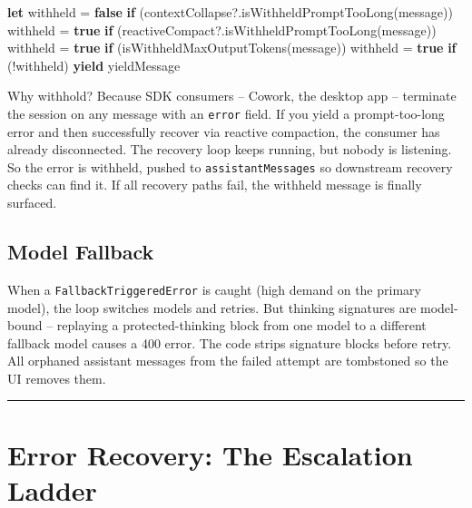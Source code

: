 \documentclass[
  english,
  11pt,
  letterpaper,
]{book}
\newenvironment{Shaded}{\begin{snugshade}}{\end{snugshade}}
\newcommand{\ControlFlowTok}[1]{\textcolor[rgb]{0.00,0.23,0.31}{\textbf{#1}}}
\newcommand{\FunctionTok}[1]{\textcolor[rgb]{0.28,0.35,0.67}{#1}}
\newcommand{\KeywordTok}[1]{\textcolor[rgb]{0.00,0.23,0.31}{\textbf{#1}}}
\newcommand{\NormalTok}[1]{\textcolor[rgb]{0.00,0.23,0.31}{#1}}
\newcommand{\OperatorTok}[1]{\textcolor[rgb]{0.37,0.37,0.37}{#1}}
\begin{document}
\begin{Shaded}
\begin{Highlighting}[]
\KeywordTok{let}\NormalTok{ withheld }\OperatorTok{=} \KeywordTok{false}
\ControlFlowTok{if}\NormalTok{ (contextCollapse}\OperatorTok{?.}\FunctionTok{isWithheldPromptTooLong}\NormalTok{(message)) withheld }\OperatorTok{=} \KeywordTok{true}
\ControlFlowTok{if}\NormalTok{ (reactiveCompact}\OperatorTok{?.}\FunctionTok{isWithheldPromptTooLong}\NormalTok{(message)) withheld }\OperatorTok{=} \KeywordTok{true}
\ControlFlowTok{if}\NormalTok{ (}\FunctionTok{isWithheldMaxOutputTokens}\NormalTok{(message)) withheld }\OperatorTok{=} \KeywordTok{true}
\ControlFlowTok{if}\NormalTok{ (}\OperatorTok{!}\NormalTok{withheld) }\KeywordTok{yield}\NormalTok{ yieldMessage}
\end{Highlighting}
\end{Shaded}

Why withhold? Because SDK consumers -- Cowork, the desktop app --
terminate the session on any message with an \texttt{error} field. If
you yield a prompt-too-long error and then successfully recover via
reactive compaction, the consumer has already disconnected. The recovery
loop keeps running, but nobody is listening. So the error is withheld,
pushed to \texttt{assistantMessages} so downstream recovery checks can
find it. If all recovery paths fail, the withheld message is finally
surfaced.

\subsection{Model Fallback}\label{model-fallback}

When a \texttt{FallbackTriggeredError} is caught (high demand on the
primary model), the loop switches models and retries. But thinking
signatures are model-bound -- replaying a protected-thinking block from
one model to a different fallback model causes a 400 error. The code
strips signature blocks before retry. All orphaned assistant messages
from the failed attempt are tombstoned so the UI removes them.

\begin{center}\rule{0.5\linewidth}{0.5pt}\end{center}

\section{Error Recovery: The Escalation
Ladder}\label{error-recovery-the-escalation-ladder}
\end{document}
